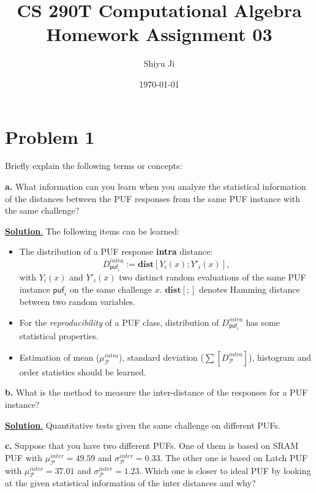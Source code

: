 \documentclass[12pt]{article}
\theoremstyle{plain}
\begin{document}
\title{CS 290T Computational Algebra Homework Assignment 03}
\author{Shiyu Ji}
\date{\today}
\maketitle

\newcommand{\m}[1]{\begin{bmatrix}#1\end{bmatrix}}
\newcommand{\rank}[1]{\operatorname{rank}(#1)}
\newcommand{\F}{\mathbb{F}}
\newcommand{\Sol}{\underline{\textbf{Solution}.} }

\section{Problem 1}
Briefly explain the following terms or concepts:

{\bf a.} What information can you learn when you analyze the statistical
information of the distances between the PUF responses from the
same PUF instance with the same challenge?

\newcommand{\p}{\mathcal{P}}
\newcommand{\puf}{\textsf{puf}}
\newcommand{\dist}{\textbf{dist}}
\Sol The following items can be learned:
\begin{itemize}
\item The distribution of a PUF response {\bf intra} distance:
$$D_{\puf_i}^{intra} := \dist[Y_i(x); Y'_i(x)],$$
with $Y_i(x)$ and $Y'_i(x)$ two distinct random evaluations of the same PUF instance $\puf_i$ on the same challenge $x$. $\dist[;]$ denotes Hamming distance between two random variables.
\item For the \emph{reproducibility} of a PUF class, distribution of $D_{\puf_i}^{intra}$ has some statistical properties.
\item Estimation of mean ($\mu_{\p}^{intra}$), standard deviation ($\sum[D_{\p}^{intra}]$), histogram and order statistics should be learned.
\end{itemize}

{\bf b.} What is the method to measure the inter-distance of the responses
for a PUF instance?

\Sol Quantitative tests given the same challenge on different PUFs.


{\bf c.} Suppose that you have two different PUFs. One of them is based
on SRAM PUF with $\mu_{\p}^{inter} = 49.59$ and $\sigma_{\p}^{inter} = 0.33$. The other one is based on Latch PUF with $\mu_{\p}^{inter} = 37.01$ and $\sigma_{\p}^{inter} = 1.23$. Which one is closer to ideal PUF by looking at the given statistical
information of the inter distances and why?
\end{document}
